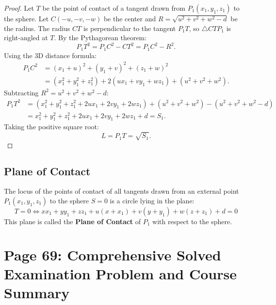\begin{proof}
Let $T$ be the point of contact of a tangent drawn from $P_1(x_1, y_1, z_1)$ to the sphere.
Let $C(-u, -v, -w)$ be the center and $R = \sqrt{u^2+v^2+w^2-d}$ be the radius.
The radius $CT$ is perpendicular to the tangent $P_1 T$, so $\triangle C T P_1$ is right-angled at $T$.
By the Pythagorean theorem:
\begin{equation}
    P_1 T^2 = P_1 C^2 - CT^2 = P_1 C^2 - R^2.
\end{equation}
Using the 3D distance formula:
\begin{align}
    P_1 C^2 &= (x_1 + u)^2 + (y_1 + v)^2 + (z_1 + w)^2 \nonumber\\
    &= (x_1^2 + y_1^2 + z_1^2) + 2(ux_1 + vy_1 + wz_1) + (u^2 + v^2 + w^2).
\end{align}
Subtracting $R^2 = u^2 + v^2 + w^2 - d$:
\begin{align}
    P_1 T^2 &= (x_1^2 + y_1^2 + z_1^2 + 2ux_1 + 2vy_1 + 2wz_1) + (u^2 + v^2 + w^2) - (u^2 + v^2 + w^2 - d) \nonumber\\
    &= x_1^2 + y_1^2 + z_1^2 + 2ux_1 + 2vy_1 + 2wz_1 + d = S_1.
\end{align}
Taking the positive square root:
\begin{equation}
    L = P_1 T = \sqrt{S_1}.
\end{equation}
\end{proof}

\subsection{Plane of Contact}
\begin{theorembox}
The locus of the points of contact of all tangents drawn from an external point $P_1(x_1, y_1, z_1)$ to the sphere $S = 0$ is a circle lying in the plane:
\begin{equation}
    \boxed{T = 0 \iff x x_1 + y y_1 + z z_1 + u(x + x_1) + v(y + y_1) + w(z + z_1) + d = 0}
\end{equation}
This plane is called the \textbf{Plane of Contact} of $P_1$ with respect to the sphere.
\end{theorembox}

\section{Page 69: Comprehensive Solved Examination Problem and Course Summary}
\label{sec:page69}

